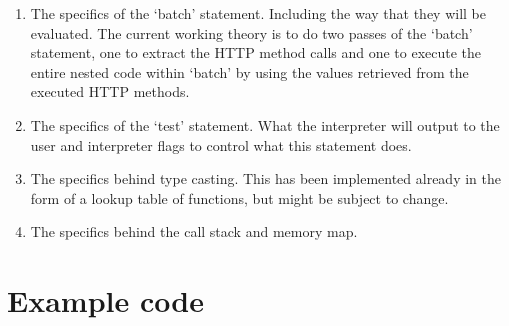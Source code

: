 \documentclass[]{interim}
\theoremstyle{definition}
\begin{document}
\begin{enumerate}
    \item The specifics of the `batch' statement. Including the way that they will be evaluated. The current working theory is to do two passes of the `batch' statement, one to extract the HTTP method calls and one to execute the entire nested code within `batch' by using the values retrieved from the executed HTTP methods.
    \item The specifics of the `test' statement. What the interpreter will output to the user and interpreter flags to control what this statement does.
    \item The specifics behind type casting. This has been implemented already in the form of a lookup table of functions, but might be subject to change.
    \item The specifics behind the call stack and memory map.
\end{enumerate}

\pagebreak

\section{Example code}
\end{document}
